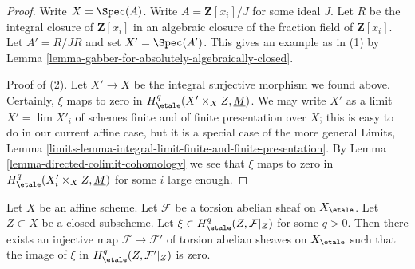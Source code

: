 \begin{proof}
Write $X = \Spec(A)$. Write $A = \mathbf{Z}[x_i]/J$ for some ideal $J$.
Let $R$ be the integral closure of $\mathbf{Z}[x_i]$ in an algebraic
closure of the fraction field of $\mathbf{Z}[x_i]$. Let
$A' = R/JR$ and set $X' = \Spec(A')$. This gives an example as in (1) by
Lemma \ref{lemma-gabber-for-absolutely-algebraically-closed}.

\medskip\noindent
Proof of (2). Let $X' \to X$ be the integral surjective morphism we found
above. Certainly, $\xi$ maps to zero in
$H^q_\etale(X' \times_X Z, \underline{M})$. We may write $X'$ as a
limit $X' = \lim X'_i$ of schemes finite and of finite presentation
over $X$; this is easy to do in our current affine case, but it
is a special case of the more general Limits, Lemma
\ref{limits-lemma-integral-limit-finite-and-finite-presentation}.
By Lemma \ref{lemma-directed-colimit-cohomology}
we see that $\xi$ maps to zero in $H^q_\etale(X'_i \times_X Z, \underline{M})$
for some $i$ large enough.
\end{proof}

\begin{lemma}
\label{lemma-efface-cohomology-on-closed-by-finite-cover}
Let $X$ be an affine scheme. Let $\mathcal{F}$ be a torsion abelian sheaf
on  $X_\etale$. Let $Z \subset X$ be a closed subscheme. Let
$\xi \in H^q_\etale(Z, \mathcal{F}|_Z)$ for some $q > 0$.
Then there exists an injective map $\mathcal{F} \to \mathcal{F}'$
of torsion abelian sheaves on $X_\etale$ such that
the image of $\xi$ in $H^q_\etale(Z, \mathcal{F}'|_Z)$ is zero.
\end{lemma}

